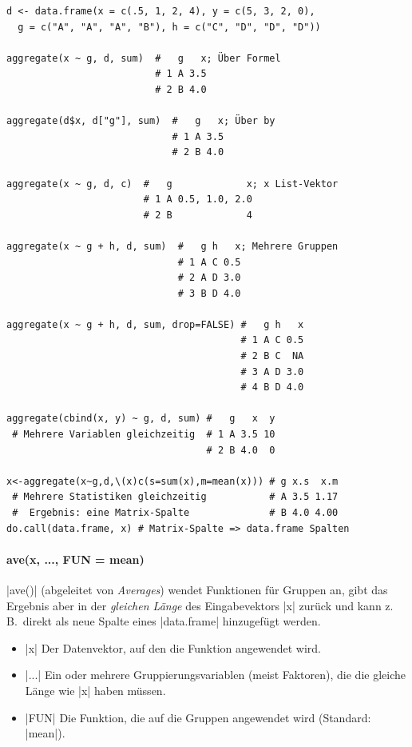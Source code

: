 \documentclass[10pt,twocolumn]{scrartcl}
\renewcommand{\lstinline}{\mycoloredinline}
\begin{document}
\begin{lstlisting}
d <- data.frame(x = c(.5, 1, 2, 4), y = c(5, 3, 2, 0),
  g = c("A", "A", "A", "B"), h = c("C", "D", "D", "D"))

aggregate(x ~ g, d, sum)  #   g   x; Über Formel
                          # 1 A 3.5
                          # 2 B 4.0

aggregate(d$x, d["g"], sum)  #   g   x; Über by
                             # 1 A 3.5
                             # 2 B 4.0

aggregate(x ~ g, d, c)  #   g             x; x List-Vektor
                        # 1 A 0.5, 1.0, 2.0
                        # 2 B             4

aggregate(x ~ g + h, d, sum)  #   g h   x; Mehrere Gruppen
                              # 1 A C 0.5
                              # 2 A D 3.0
                              # 3 B D 4.0

aggregate(x ~ g + h, d, sum, drop=FALSE) #   g h   x
                                         # 1 A C 0.5
                                         # 2 B C  NA
                                         # 3 A D 3.0
                                         # 4 B D 4.0

aggregate(cbind(x, y) ~ g, d, sum) #   g   x  y
 # Mehrere Variablen gleichzeitig  # 1 A 3.5 10
                                   # 2 B 4.0  0

x<-aggregate(x~g,d,\(x)c(s=sum(x),m=mean(x))) # g x.s  x.m
 # Mehrere Statistiken gleichzeitig           # A 3.5 1.17
 #  Ergebnis: eine Matrix-Spalte              # B 4.0 4.00
do.call(data.frame, x) # Matrix-Spalte => data.frame Spalten
\end{lstlisting}


\paragraph{ave(x, ..., FUN = mean)}

\lstinline|ave()|  (abgeleitet von \emph{Averages}) wendet Funktionen für Gruppen an, gibt das Ergebnis aber in der \emph{gleichen Länge} des Eingabevektors \lstinline|x| zurück und kann z.\,B.\ direkt als neue Spalte eines \lstinline|data.frame| hinzugefügt werden.

\begin{itemize}
\item \lstinline|x| Der Datenvektor, auf den die Funktion angewendet wird.
\item \lstinline|...| Ein oder mehrere Gruppierungsvariablen (meist Faktoren), die die gleiche Länge wie \lstinline|x| haben müssen.
\item \lstinline|FUN| Die Funktion, die auf die Gruppen angewendet wird (Standard: \lstinline|mean|).
\end{itemize}
\end{document}
